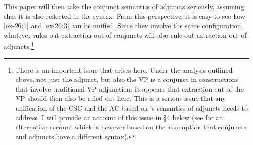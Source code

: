 \documentclass[output=paper]{langsci/langscibook}
\begin{document}
This paper will then take the conjunct semantics of adjuncts seriously,
assuming that it is also reflected in the syntax. From this perspective, it is
easy to see how \eqref{ex-26:1} and \eqref{ex-26:3} can be unified. Since they involve the same
configuration, whatever rules out extraction out of conjuncts will also rule
out extraction out of adjuncts.\footnote{There is an important issue that
    arises here. Under the analysis outlined above, not just the adjunct, but
    also the VP is a conjunct in constructions that involve traditional
    VP-adjunction.  It appears that extraction out of the VP should then also
    be ruled out here.  This is a serious issue that any unification of the
    \gls{CSC} and the \glsdesc{AC} based on \citeauthor{Higginbotham1985}’s
    semantics of adjuncts needs to address. I will provide an account of this
    issue in §4 below (see \citealt{Takahashi1994} for an alternative account
    which is however based on the assumption that conjuncts and adjuncts have a
different syntax).}
\end{document}
